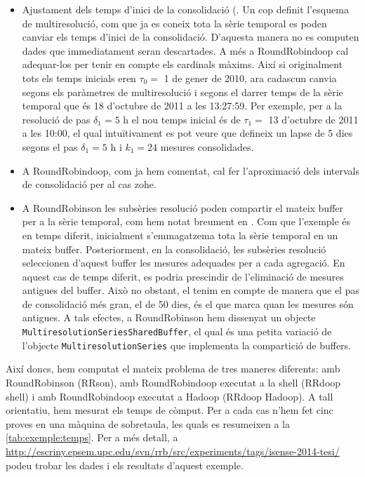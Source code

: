 \begin{itemize}
\item Ajustament dels temps d'inici de la consolidació
  (. Un cop definit l'esquema
  de multiresolució, com que ja es coneix tota la sèrie temporal es
  poden canviar els temps d'inici de la consolidació. D'aquesta manera
  no es computen dades que immediatament seran descartades. A més a
  RoundRobindoop cal adequar-los per tenir en compte els cardinals
  màxims. Així si originalment tots els temps inicials eren $\tau_0=$
  1 de gener de 2010, ara cadascun canvia segons els paràmetres de
  multiresolució i segons el darrer temps de la sèrie temporal que és
  18 d'octubre de 2011 a les 13:27:59. Per exemple, per a la resolució
  de pas $\delta_1=5 \text{ h}$ el nou temps inicial és de $\tau_1=$
  13 d'octubre de 2011 a les 10:00, el qual intuïtivament es pot veure
  que defineix un lapse de 5 dies segons el pas $\delta_1=5 \text{ h}$
  i $k_1=24$ mesures consolidades.


\item A RoundRobindoop, com ja hem comentat, cal fer l'aproximació
  dels intervals de consolidació per al cas \gls{zohe}.


\item A RoundRobinson les subsèries resolució poden compartir el
  mateix buffer per a la sèrie temporal, com hem notat breument en
  . Com que l'exemple és
  en temps diferit, inicialment s'emmagatzema tota la sèrie temporal
  en un mateix buffer. Posteriorment, en la consolidació, les
  subsèries resolució seleccionen d'aquest buffer les mesures
  adequades per a cada agregació. En aquest cas de temps diferit, es
  podria prescindir de l'eliminació de mesures antigues del
  buffer. Això no obstant, el tenim en compte de manera que el pas de
  consolidació més gran, el de 50 dies, és el que marca quan les
  mesures són antigues. A tals efectes, a RoundRobinson hem dissenyat
  un objecte \lstinline[style=py]+MultiresolutionSeriesSharedBuffer+,
  el qual és una petita variació de l'objecte
  \lstinline[style=py]+MultiresolutionSeries+ que implementa la
  compartició de buffers.

\end{itemize}




Així doncs, hem computat el mateix problema de tres maneres diferents:
amb RoundRobinson (RRson), amb RoundRobindoop executat a la shell
(RRdoop shell) i amb RoundRobindoop executat a Hadoop (RRdoop
Hadoop). A tall orientatiu, hem mesurat els temps de còmput. Per a cada
cas n'hem fet cinc proves en una màquina de sobretaula, les
quals es resumeixen a la \autoref{tab:exemple:temps}. 
%
Per a més detall, a
\url{http://escriny.epsem.upc.edu/svn/rrb/src/experiments/tags/isense-2014-tesi/}
podeu trobar les dades i els resultats d'aquest exemple.


